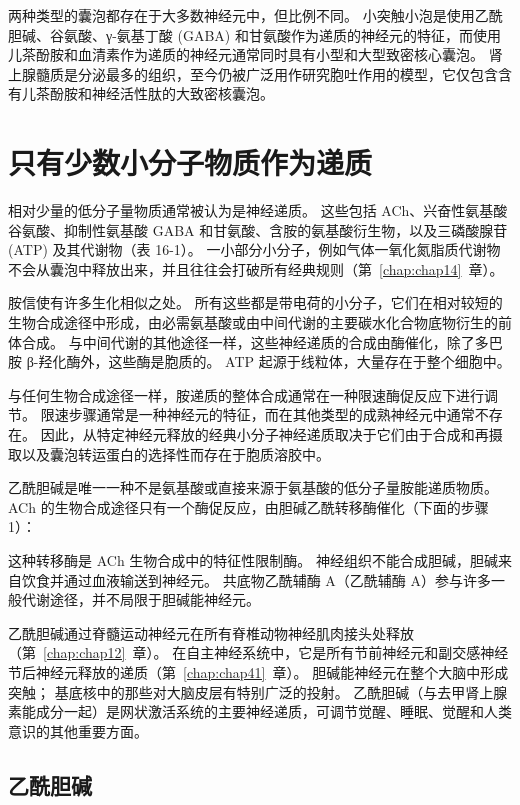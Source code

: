 两种类型的囊泡都存在于大多数神经元中，但比例不同。 
小突触小泡是使用乙酰胆碱、谷氨酸、γ-氨基丁酸 (GABA) 和甘氨酸作为递质的神经元的特征，而使用儿茶酚胺和血清素作为递质的神经元通常同时具有小型和大型致密核心囊泡。
肾上腺髓质是分泌最多的组织，至今仍被广泛用作研究胞吐作用的模型，它仅包含含有儿茶酚胺和神经活性肽的大致密核囊泡。



\section{只有少数小分子物质作为递质}

相对少量的低分子量物质通常被认为是神经递质。
这些包括 ACh、兴奋性氨基酸谷氨酸、抑制性氨基酸 GABA 和甘氨酸、含胺的氨基酸衍生物，以及三磷酸腺苷 (ATP) 及其代谢物（表 16-1）。
一小部分小分子，例如气体一氧化氮脂质代谢物不会从囊泡中释放出来，并且往往会打破所有经典规则（第~\ref{chap:chap14}~章）。


胺信使有许多生化相似之处。
所有这些都是带电荷的小分子，它们在相对较短的生物合成途径中形成，由必需氨基酸或由中间代谢的主要碳水化合物底物衍生的前体合成。
与中间代谢的其他途径一样，这些神经递质的合成由酶催化，除了多巴胺 β-羟化酶外，这些酶是胞质的。
ATP 起源于线粒体，大量存在于整个细胞中。


与任何生物合成途径一样，胺递质的整体合成通常在一种限速酶促反应下进行调节。
限速步骤通常是一种神经元的特征，而在其他类型的成熟神经元中通常不存在。
因此，从特定神经元释放的经典小分子神经递质取决于它们由于合成和再摄取以及囊泡转运蛋白的选择性而存在于胞质溶胶中。


乙酰胆碱是唯一一种不是氨基酸或直接来源于氨基酸的低分子量胺能递质物质。
ACh 的生物合成途径只有一个酶促反应，由胆碱乙酰转移酶催化（下面的步骤 1）：


这种转移酶是 ACh 生物合成中的特征性限制酶。
神经组织不能合成胆碱，胆碱来自饮食并通过血液输送到神经元。
共底物乙酰辅酶 A（乙酰辅酶 A）参与许多一般代谢途径，并不局限于胆碱能神经元。


乙酰胆碱通过脊髓运动神经元在所有脊椎动物神经肌肉接头处释放（第~\ref{chap:chap12}~章）。
在自主神经系统中，它是所有节前神经元和副交感神经节后神经元释放的递质（第~\ref{chap:chap41}~章）。 
胆碱能神经元在整个大脑中形成突触；
基底核中的那些对大脑皮层有特别广泛的投射。
乙酰胆碱（与去甲肾上腺素能成分一起）是网状激活系统的主要神经递质，可调节觉醒、睡眠、觉醒和人类意识的其他重要方面。



\subsection{乙酰胆碱}


